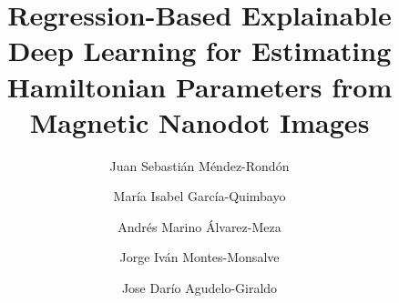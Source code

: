 \documentclass[preprint,12pt]{elsarticle}
\begin{document}
\newcommand{\Real}{\mathbb{R}}
\newcommand{\N}{\mathbb{N}}
\newcommand{\Z}{\mathbb{Z}}
\newcommand{\X}{\mathcal{X}}
\newcommand{\Y}{\mathcal{Y}}
\newcommand{\boldV}{\mathbf{V}}
\newcommand{\dataset}{{\cal D}}
\newcommand{\gauss}{\mathcal{N}} 

\providecommand{\ch}[1]{\textcolor{blue!50}{#1}}

\let\WriteBookmarks\relax
\def\floatpagepagefraction{1}
\def\textpagefraction{.001}


\begin{frontmatter}


\title{Regression-Based Explainable Deep Learning for Estimating Hamiltonian Parameters from Magnetic Nanodot Images}

\author[unal]{Juan Sebasti\'an M\'endez-Rond\'on}

\author[unal]{Mar\'ia Isabel Garc\'ia-Quimbayo}

\author[unal]{Andr\'es Marino \'Alvarez-Meza}

\author[unal1]{Jorge Iv\'an Montes-Monsalve}

\author[uam]{Jose Dar\'io Agudelo-Giraldo}

\address[unal]{AI-Lab, Signal Processing and Recognition Group, Universidad Nacional de Colombia, Sede Manizales, 170003 Manizales, Colombia}

\address[unal1]{Direcci\'on Acad\'emica, Universidad Nacional de Colombia, Sede de La Paz, 202010 La Paz, Colombia}

\address[uam]{Grupo de Investigaci\'on en F\'isica y Matem\'aticas con \'Enfasis en la Formaci\'on de Ingenieros, Departamento de F\'isica y Matem\'aticas, Facultad de Ingenier\'ia, Universidad Aut\'onoma de Manizales, Antigua Estaci\'on del Ferrocarril, 170002  Manizales, Colombia}



\end{frontmatter}
\end{document}
